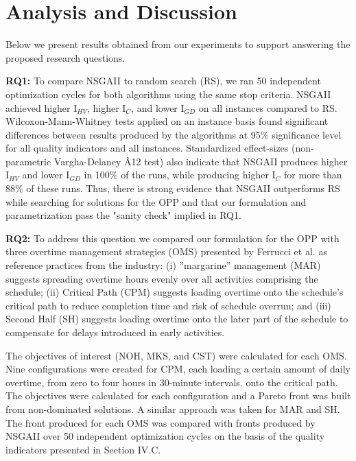 \documentclass[conference]{IEEEtran}
\begin{document}
\section{Analysis and Discussion}
Below we present results obtained from our experiments to support answering the proposed research questions.

\noindent
\textbf{RQ1:} To compare NSGAII to random search (RS), we ran 50 independent optimization cycles for both algorithms using the same stop criteria. NSGAII achieved higher I$_{HV}$, higher I$_{C}$, and lower I$_{GD}$ on all instances compared to RS. Wilcoxon-Mann-Whitney tests applied on an instance basis found significant differences between results produced by the algorithms at 95\% significance level for all quality indicators and all instances. Standardized effect-sizes (non-parametric Vargha-Delaney {\^A}12 test) also indicate that NSGAII produces higher I$_{HV}$ and lower I$_{GD}$ in 100\% of the runs, while producing higher I$_{C}$ for more than 88\% of these runs. Thus, there is strong evidence that NSGAII outperforms RS while searching for solutions for the OPP and that our formulation and parametrization pass the "sanity check" implied in RQ1.

\noindent
\textbf{RQ2:} To address this question we compared our formulation for the OPP with three overtime management strategies (OMS) presented by Ferrucci et al. \cite{Ferrucci:2013} as reference practices from the industry: (i) ''margarine'' management (MAR) suggests spreading overtime hours evenly over all activities comprising the schedule; (ii) Critical Path (CPM) suggests loading overtime onto the schedule's critical path to reduce completion time and risk of schedule overrun; and (iii) Second Half (SH) suggests loading overtime onto the later part of the schedule to compensate for delays introduced in early activities. 

The objectives of interest (NOH, MKS, and CST) were calculated for each OMS. Nine configurations were created for CPM, each loading a certain amount of daily overtime, from zero to four hours in 30-minute intervals, onto the critical path. The objectives were calculated for each configuration and a Pareto front was built from non-dominated solutions. A similar approach was taken for MAR and SH. The front produced for each OMS was compared with fronts produced by NSGAII over 50 independent optimization cycles on the basis of the quality indicators presented in Section IV.C.
\end{document}
